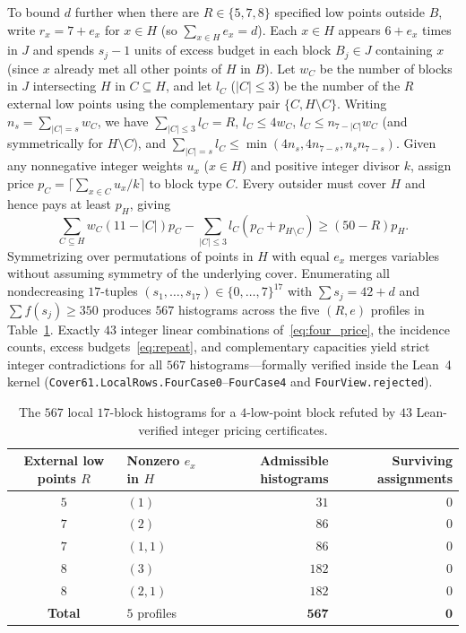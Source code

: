 \documentclass[11pt,a4paper]{article}
\theoremstyle{definition}
\theoremstyle{remark}
\begin{document}
To bound $d$ further when there are $R \in \{5,7,8\}$ specified low points outside $B$, write $r_x = 7 + e_x$ for $x \in H$ (so $\sum_{x \in H} e_x = d$). Each $x \in H$ appears $6 + e_x$ times in $J$ and spends $s_j - 1$ units of excess budget in each block $B_j \in J$ containing $x$ (since $x$ already met all other points of $H$ in $B$). Let $w_C$ be the number of blocks in $J$ intersecting $H$ in $C \subseteq H$, and let $l_C$ ($|C| \le 3$) be the number of the $R$ external low points using the complementary pair $\{C, H \setminus C\}$. Writing $n_s = \sum_{|C|=s} w_C$, we have $\sum_{|C| \le 3} l_C = R$, $l_C \le 4w_C$, $l_C \le n_{7-|C|}w_C$ (and symmetrically for $H \setminus C$), and $\sum_{|C|=s} l_C \le \min(4n_s, 4n_{7-s}, n_s n_{7-s})$. Given any nonnegative integer weights $u_x$ ($x \in H$) and positive integer divisor $k$, assign price $p_C = \lceil \sum_{x \in C} u_x / k \rceil$ to block type $C$. Every outsider must cover $H$ and hence pays at least $p_H$, giving
\begin{equation}\label{eq:four_price}
  \sum_{C \subseteq H} w_C(11 - |C|)p_C - \sum_{|C| \le 3} l_C(p_C + p_{H \setminus C}) \ge (50 - R)p_H.
\end{equation}
Symmetrizing over permutations of points in $H$ with equal $e_x$ merges variables without assuming symmetry of the underlying cover. Enumerating all nondecreasing $17$-tuples $(s_1,\dots,s_{17}) \in \{0,\dots,7\}^{17}$ with $\sum s_j = 42 + d$ and $\sum f(s_j) \ge 350$ produces $567$ histograms across the five $(R, e)$ profiles in Table~\ref{tab:four_local}. Exactly $43$ integer linear combinations of~\eqref{eq:four_price}, the incidence counts, excess budgets~\eqref{eq:repeat}, and complementary capacities yield strict integer contradictions for all $567$ histograms—formally verified inside the Lean~4 kernel (\texttt{Cover61.LocalRows.FourCase0}--\texttt{FourCase4} and \texttt{FourView.rejected}).

\begin{table}[t]
\centering
\caption{The $567$ local $17$-block histograms for a $4$-low-point block refuted by $43$ Lean-verified integer pricing certificates.}
\label{tab:four_local}
\small
\begin{tabular}{@{}clrr@{}}
\toprule
External low points $R$ & Nonzero $e_x$ in $H$ & Admissible histograms & Surviving assignments \\
\midrule
$5$ & $(1)$           & $31$  & $0$ \\
$7$ & $(2)$           & $86$  & $0$ \\
$7$ & $(1,1)$         & $86$  & $0$ \\
$8$ & $(3)$           & $182$ & $0$ \\
$8$ & $(2,1)$         & $182$ & $0$ \\
\midrule
\textbf{Total} & $5$ profiles & $\mathbf{567}$ & $\mathbf{0}$ \\
\bottomrule
\end{tabular}
\end{table}
\end{document}
